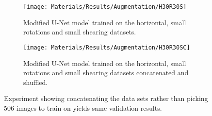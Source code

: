 \begin{figure}
	\centering
	\begin{subfigure}[b]{0.35\linewidth}
		\centering
		\texttt{[image: Materials/Results/Augmentation/H30R30S]}
		\caption{Modified U-Net model trained on the horizontal, small rotations and small shearing datasets.\newline}
	\end{subfigure}
	\qquad
	\begin{subfigure}[b]{0.35\linewidth}
		\centering
		\texttt{[image: Materials/Results/Augmentation/H30R30SC]}
		\caption{Modified U-Net model trained on the horizontal, small rotations and small shearing datasets concatenated and shuffled.}
	\end{subfigure}
	\caption{Experiment showing concatenating the data sets rather than picking 506 images to train on yields same validation results.}
	\label{concat}
\end{figure}


